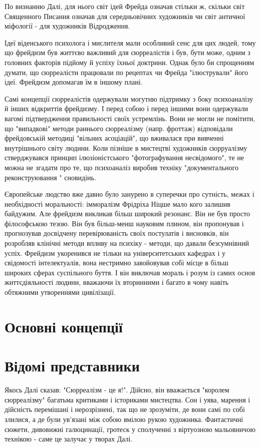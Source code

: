 \documentclass[14pt]{extarticle} %
\begin{document}
По визнанню Далі, для нього світ ідей Фрейда означав стільки ж, скільки світ Священного Писання означав для середньовічних художників чи світ
античної міфології - для художників Відродження.

Ідеї віденського психолога і мислителя мали особливий сенс для цих людей, тому що фрейдизм був життєво
важливий для сюрреалістів і був, бути може, одним з головних факторів підйому й успіху їхньої доктрини. Однак було би спрощенням
думати, що сюрреалісти працювали по рецептах чи Фрейда "ілюстрували" його ідеї. Фрейдизм допомагав їм в іншому плані.

Самі концепції сюрреалістів одержували могутню підтримку з боку психоаналізу й інших відкриттів фрейдизму. І перед собою і перед
іншими вони одержували вагомі підтвердження правильності своїх устремлінь. Вони не могли не помітити, що "випадкові" методи раннього сюрреалізму 
(напр. фроттаж) відповідали фрейдовській методиці "вільних асоціацій", що вживалася при вивченні внутрішнього світу людини. Коли
пізніше в мистецтві художників сюрруалізму стверджувався принцип ілюзіоністського "фотографування несвідомого", те не можна не згадати про те,
що психоаналіз виробив техніку "документального реконструювання " сновидінь.

Європейське людство вже давно було занурено в суперечки про сутність, межах і необхідності моральності: імморалізм Фрідріха Ніцше мало кого
залишив байдужим. Але фрейдизм викликав більш широкий резонанс. Він не був просто філософською тезою. Він був більш-менш науковим
плином, він пропонував і прогнозував досвідчену перевірюваність своїх постулатів і висновків, він розробляв клінічні методи впливу на психіку
- методи, що давали безсумнівний успіх. Фрейдизм укоренився не тільки на університетських кафедрах і у свідомості інтелектуалів, вона нестримно
завойовував собі місце в більш широких сферах суспільного буття. І він виключав мораль і розум із самих основ життєдіяльності людини, вважаючи
їх вторинними і багато в чому навіть обтяжними утвореннями цивілізації.
\section{Основні концепції}
\section{Відомі представники}
Якось Далі сказав: "Сюрреалізм - це я!". Дійсно, він вважається "королем сюрреалізму" багатьма критиками і істориками мистецтва. Сон і уява, 
марення і дійсність перемішані і нерозрізнені, так що не зрозуміти, де вони самі по собі злилися, а де були ув'язані між собою вмілою рукою 
художника. Фантастичні сюжети, дивовижні галюцинації, гротеск у сполученні з віртуозною мальовничою технікою - саме це залучає у творах Далі.
\end{document}
